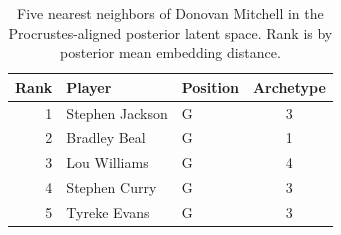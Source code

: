 \begin{table}[htbp]
  \centering\small
  \begin{tabular}{rllc}
    \toprule
    Rank & Player & Position & Archetype \\
    \midrule
    1 & Stephen Jackson & G & 3 \\
    2 & Bradley Beal & G & 1 \\
    3 & Lou Williams & G & 4 \\
    4 & Stephen Curry & G & 3 \\
    5 & Tyreke Evans & G & 3 \\
    \bottomrule
  \end{tabular}
  \caption{Five nearest neighbors of Donovan Mitchell in the Procrustes-aligned posterior latent space. Rank is by posterior mean embedding distance.}
  \label{tab:Donovan_Mitchell_neighbors}
\end{table}

